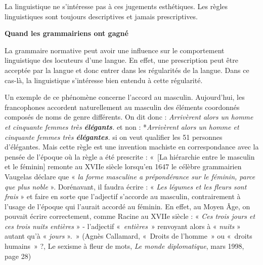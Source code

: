 {    La linguistique ne s’intéresse pas à ces jugements esthétiques. Les règles linguistiques sont toujours descriptives et jamais prescriptives.

    {\bfseries
    Quand les grammairiens ont gagné
    }

    La grammaire normative peut avoir une influence sur le comportement linguistique des locuteurs d’une langue. En effet, une prescription peut être acceptée par la langue et donc entrer dans les régularités de la langue. Dans ce cas-là, la linguistique s’intéresse bien entendu à cette régularité.

    Un exemple de ce phénomène concerne l’accord au masculin. Aujourd’hui, les francophones accordent naturellement au masculin des éléments coordonnés composés de noms de genre différents. On dit donc :
    \ea
         \textit{{Arrivèrent alors un homme et cinquante femmes très} \textbf{{élégants}}.}
    \z
    et non :
    \ea
        *\textit{{Arrivèrent alors un homme et cinquante femmes très} \textbf{{élégantes}}.}
    \z
    si on veut qualifier les 51 personnes d’élégantes. Mais cette règle est une invention machiste en correspondance avec la pensée de l’époque où la règle a été prescrite : «~[La hiérarchie entre le masculin et le féminin] remonte au XVIIe siècle lorsqu’en 1647 le célèbre grammairien Vaugelas déclare que « \textit{la forme masculine a prépondérance sur le féminin, parce que plus noble} ». Dorénavant, il faudra écrire : « \textit{Les légumes et les fleurs sont frais} » et faire en sorte que l’adjectif s’accorde au masculin, contrairement à l’usage de l’époque qui l’aurait accordé au féminin. En effet, au Moyen Âge, on pouvait écrire correctement, comme Racine au XVIIe siècle : « \textit{Ces trois jours et ces trois nuits entières} » - l’adjectif «~\textit{entières}~» renvoyant alors à « \textit{nuits} » autant qu’à « \textit{jours} ».~» (Agnès Callamard, «~Droits de l’homme~» ou «~droits humains~» ?, Le sexisme à fleur de mots, \textit{Le monde diplomatique}, mars 1998, page 28)
}
